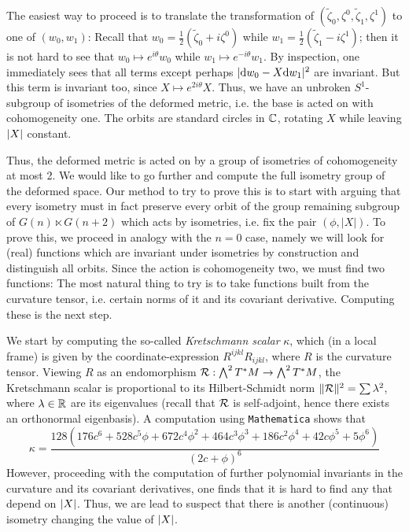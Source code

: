The easiest way to proceed is to translate the transformation of $(\tilde\zeta_0,\zeta^0,\tilde\zeta_1,\zeta^1)$ to one of $(w_0,w_1)$: Recall that $w_0=\frac{1}{2}(\tilde\zeta_0+i\zeta^0)$ while $w_1=\frac{1}{2}(\tilde\zeta_1-i\zeta^1)$; then it is not hard to see that $w_0\mapsto e^{i\theta}w_0$ while $w_1\mapsto e^{-i\theta}w_1$. By inspection, one immediately sees that all terms except perhaps $\lvert \mathrm{d} w_0-X\mathrm{d} w_1 \rvert^2$ are invariant. But this term is invariant too, since $X\mapsto e^{2i\theta}X$. Thus, we have an unbroken $S^1$-subgroup of isometries of the deformed metric, i.e. the base is acted on with cohomogeneity one. The orbits are standard circles in $\mathbb{C}$, rotating $X$ while leaving $\lvert X \rvert$ constant.

Thus, the deformed metric is acted on by a group of isometries of cohomogeneity at most 2. We would like to go further and compute the full isometry group of the deformed space. Our method to try to prove this is to start with arguing that every isometry must in fact preserve every orbit of the group remaining subgroup of $G(n)\ltimes G(n+2)$ which acts by isometries, i.e. fix the pair $(\phi,|X|)$. To prove this, we proceed in analogy with the $n=0$ case, namely we will look for (real) functions which are invariant under isometries by construction and distinguish all orbits. Since the action is cohomogeneity two, we must find two functions: The most natural thing to try is to take functions built from the curvature tensor, i.e. certain norms of it and its covariant derivative. Computing these is the next step.

We start by computing the so-called \emph{Kretschmann scalar} $\kappa$, which (in a local frame) is given by the coordinate-expression $R^{ijkl} R_{ijkl}$, where $R$ is the curvature tensor. Viewing $R$ as an endomorphism $\mathcal{R}:\bigwedge^2 T^*M\to \bigwedge^2 T^*M$, the Kretschmann scalar is proportional to its Hilbert-Schmidt norm $\lVert \mathcal{R} \rVert^2=\sum \lambda^2$, where $\lambda\in\mathbb{R}$ are its eigenvalues (recall that $\mathcal{R}$ is self-adjoint, hence there exists an orthonormal eigenbasis). A computation using \texttt{Mathematica} shows that
\begin{equation*}
	\kappa=\frac{128(176c^6 + 528c^5\phi + 672c^4\phi^2 + 464c^3\phi^3 + 186c^2\phi^4 + 42c\phi^5+5 \phi^6)}{(2 c+\phi)^6}
\end{equation*}
However, proceeding with the computation of further polynomial invariants in the curvature and its covariant derivatives, one finds that it is hard to find any that depend on $\lvert X \rvert$. Thus, we are lead to suspect that there is another (continuous) isometry changing the value of $\lvert X \rvert$.

